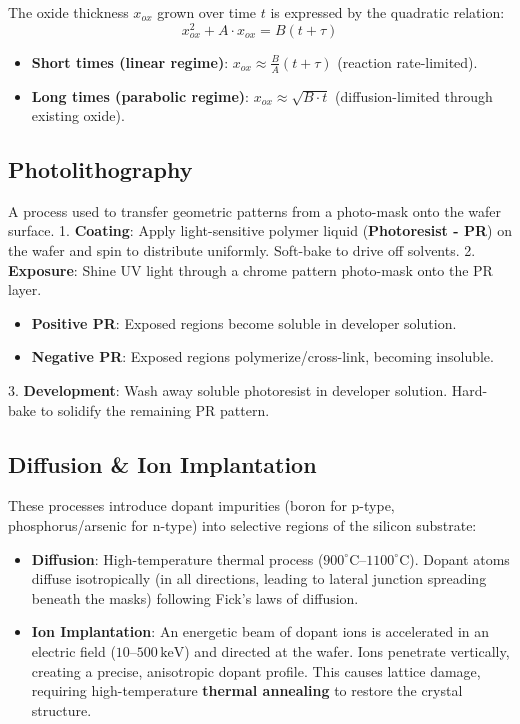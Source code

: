 \documentclass[12pt,a4paper]{article}
\begin{document}
\begin{tcolorbox}[defbox, title={\textbf{Deal-Grove Model of Oxidation}}]
The oxide thickness $x_{ox}$ grown over time $t$ is expressed by the quadratic relation:
\begin{equation}
  x_{ox}^2 + A \cdot x_{ox} = B(t + \tau)
\end{equation}
\begin{itemize}[leftmargin=*, itemsep=2.5pt, topsep=2.5pt]
  \item \textbf{Short times (linear regime)}: $x_{ox} \approx \frac{B}{A}(t + \tau)$ (reaction rate-limited).
  \item \textbf{Long times (parabolic regime)}: $x_{ox} \approx \sqrt{B \cdot t}$ (diffusion-limited through existing oxide).
\end{itemize}
\end{tcolorbox}

\subsection{Photolithography}
A process used to transfer geometric patterns from a photo-mask onto the wafer surface.
1. \textbf{Coating}: Apply light-sensitive polymer liquid (\textbf{Photoresist - PR}) on the wafer and spin to distribute uniformly. Soft-bake to drive off solvents.
2. \textbf{Exposure}: Shine UV light through a chrome pattern photo-mask onto the PR layer.
   \begin{itemize}[leftmargin=*, noitemsep, topsep=2pt]
     \item \textbf{Positive PR}: Exposed regions become soluble in developer solution.
     \item \textbf{Negative PR}: Exposed regions polymerize/cross-link, becoming insoluble.
   \end{itemize}
3. \textbf{Development}: Wash away soluble photoresist in developer solution. Hard-bake to solidify the remaining PR pattern.

\subsection{Diffusion \& Ion Implantation}
These processes introduce dopant impurities (boron for p-type, phosphorus/arsenic for n-type) into selective regions of the silicon substrate:
\begin{itemize}[leftmargin=*, itemsep=3.5pt]
  \item \textbf{Diffusion}: High-temperature thermal process ($900^\circ\text{C}$--$1100^\circ\text{C}$). Dopant atoms diffuse isotropically (in all directions, leading to lateral junction spreading beneath the masks) following Fick's laws of diffusion.
  \item \textbf{Ion Implantation}: An energetic beam of dopant ions is accelerated in an electric field ($10$--$500\,\text{keV}$) and directed at the wafer. Ions penetrate vertically, creating a precise, anisotropic dopant profile. This causes lattice damage, requiring high-temperature \textbf{thermal annealing} to restore the crystal structure.
\end{itemize}
\end{document}
